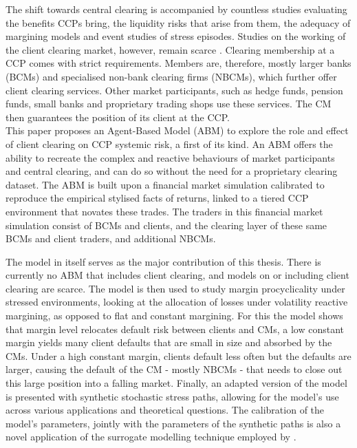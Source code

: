 The shift towards central clearing is accompanied by countless studies evaluating the benefits CCPs bring, the liquidity risks that arise from them, the adequacy of margining models and event studies of stress episodes. Studies on the working of the client clearing market, however, remain scarce \citep{menkveld_vuillemey_2021}. Clearing membership at a CCP comes with strict requirements. Members are, therefore, mostly larger banks (BCMs) and specialised non-bank clearing firms (NBCMs), which further offer client clearing services. Other market participants, such as hedge funds, pension funds, small banks and proprietary trading shops use these services. The CM then guarantees the position of its client at the CCP.\\

\noindent This paper proposes an Agent-Based Model (ABM) to explore the role and effect of client clearing on CCP systemic risk, a first of its kind. An ABM offers the ability to recreate the complex and reactive behaviours of market participants and central clearing, and can do so without the need for a proprietary clearing dataset. The ABM is built upon a financial market simulation calibrated to reproduce the empirical stylised facts of returns, linked to a tiered CCP environment that novates these trades. The traders in this financial market simulation consist of BCMs and clients, and the clearing layer of these same BCMs and client traders, and additional NBCMs.

The model in itself serves as the major contribution of this thesis. There is currently no ABM that includes client clearing, and models on or including client clearing are scarce. The model is then used to study margin procyclicality under stressed environments, looking at the allocation of losses under volatility reactive margining, as opposed to flat and constant margining. For this the model shows that margin level relocates default risk between clients and CMs, a low constant margin yields many client defaults that are small in size and absorbed by the CMs. Under a high constant margin, clients default less often but the defaults are larger, causing the default of the CM - mostly NBCMs -  that needs to close out this large position into a falling market. Finally, an adapted version of the model is presented with synthetic stochastic stress paths, allowing for the model's use across various applications and theoretical questions. The calibration of the model's parameters, jointly with the parameters of the synthetic paths is also a novel application of the surrogate modelling technique employed by \cite{gao_2022_xgb}.

